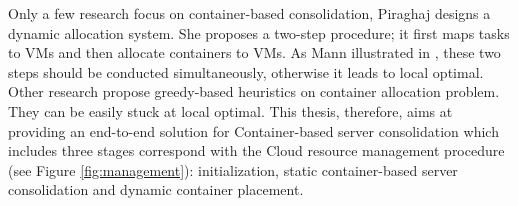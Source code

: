 Only a few research focus on container-based consolidation, Piraghaj \cite{Piraghaj:2016bw} designs a dynamic allocation system. She proposes a two-step procedure; it first maps tasks to VMs and then allocate containers to VMs. As Mann illustrated in \cite{Mann:2016hx},  these two steps should be conducted simultaneously, otherwise it leads to local optimal. Other research \cite{Dong:2014iz, Hindman:2011ux, Anselmi:2008ik} propose greedy-based heuristics on container allocation problem. They can be easily stuck at local optimal. 
This thesis, therefore, aims at providing an end-to-end solution for Container-based server consolidation which includes three stages correspond with the Cloud resource management procedure (see Figure \ref{fig:management}): initialization, static container-based server consolidation and dynamic container placement.



